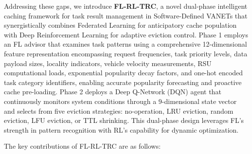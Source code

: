 Addressing these gaps, we introduce \textbf{FL-RL-TRC}, a novel dual-phase intelligent caching framework for task result management in Software-Defined VANETs that synergistically combines Federated Learning for anticipatory cache population with Deep Reinforcement Learning for adaptive eviction control. Phase 1 employs an FL advisor that examines task patterns using a comprehensive 12-dimensional feature representation encompassing request frequencies, task priority levels, data payload sizes, locality indicators, vehicle velocity measurements, RSU computational loads, exponential popularity decay factors, and one-hot encoded task category identifiers, enabling accurate popularity forecasting and proactive cache pre-loading. Phase 2 deploys a Deep Q-Network (DQN) agent that continuously monitors system conditions through a 9-dimensional state vector and selects from five eviction strategies: no-operation, LRU eviction, random eviction, LFU eviction, or TTL shrinking. This dual-phase design leverages FL's strength in pattern recognition with RL's capability for dynamic optimization.

The key contributions of FL-RL-TRC are as follows:

